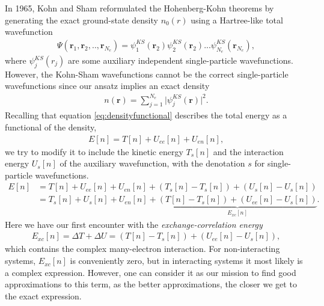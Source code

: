 In 1965, Kohn and Sham \cite{Kohn1965} reformulated the Hohenberg-Kohn theorems by generating the exact ground-state density $n_0(r)$ using a Hartree-like total wavefunction
\begin{align}
    \Psi(\boldsymbol{r}_1,\boldsymbol{r}_2,..,\boldsymbol{r}_{N_e}) = \psi_1^{KS}(\boldsymbol{r}_2)\psi_2^{KS}(\boldsymbol{r}_2)...\psi_{N_e}^{KS}(\boldsymbol{r}_{N_e}),
\end{align}
where $\psi_j^{KS}(r_j)$ are some auxiliary independent single-particle wavefunctions. However, the Kohn-Sham wavefunctions cannot be the correct single-particle wavefunctions since our ansatz implies an exact density
\begin{align}
  n(\boldsymbol{r}) = \sum_{j=1}^{N_e}\lvert \psi_j^{KS}(\boldsymbol{r})\rvert^2.
\end{align}
Recalling that equation \autoref{eq:densityfunctional} describes the total energy as a functional of the density,
\begin{align}
  E[n] = T[n] + U_{ee}[n] + U_{en}[n],
\end{align}
we try to modify it to include the kinetic energy $T_s[n]$ and the interaction energy $U_s[n]$ of the auxiliary wavefunction, with the denotation $s$ for single-particle wavefunctions.
\begin{align*}
  E[n] &= T[n] + U_{ee}[n] + U_{en}[n] + \left( T_s[n] - T_s[n] \right) + \left( U_s[n] - U_s[n] \right) \\
  &= T_s[n] + U_{s}[n] + U_{en}[n] + \underbrace{\left(T[n] - T_s[n] \right) + \left( U_{ee}[n] - U_s[n] \right)}_{E_{xc}[n]}.
\end{align*}
Here we have our first encounter with the \textit{exchange-correlation energy}
\begin{align}
  E_{xc}[n] = \Delta T + \Delta U = \left(T[n] - T_s[n] \right) + \left( U_{ee}[n] - U_s[n] \right),
\end{align}
which contains the complex many-electron interaction. For non-interacting systems, $E_{xc}[n]$ is conveniently zero, but in interacting systems it most likely is a complex expression. However, one can consider it as our mission to find good approximations to this term, as the better approximations, the closer we get to the exact expression.

